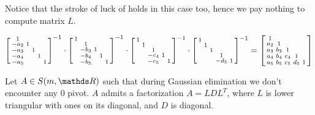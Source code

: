 \documentclass[computationalMathematics.tex]{subfiles}
\begin{document}
\begin{obs}
  Notice that the stroke of luck of  holds in this case too, hence we pay nothing to compute matrix $L$.
  
\begin{gather*}
\begin{bsmallmatrix}
    1 & \\
    -a_2 & 1 & \\
    -a_3 &  & 1  \\
    -a_4 &  & & 1  \\
    -a_5 &  &  & & 1 
\end{bsmallmatrix}^{-1} \cdot
\begin{bsmallmatrix}
    1 & \\
     & 1 & \\
     & -b_3 & 1  \\
     & -b_4 & & 1  \\
     & -b_5 &  & & 1 
\end{bsmallmatrix}^{-1} \cdot
\begin{bsmallmatrix}
    1 & \\
     & 1 & \\
     &  & 1  \\
     &  & -c_4& 1  \\
     &  & -c_5 & & 1 
\end{bsmallmatrix}^{-1} \cdot 
\begin{bsmallmatrix}
    1 & \\
     & 1 & \\
     &  & 1  \\
     &  & & 1  \\
     &  &  & -d_5& 1 
\end{bsmallmatrix}^{-1}
= \begin{bsmallmatrix}
    1 & \\
    a_2 & 1 & \\
    a_3 & b_3 & 1  \\
    a_4 & b_4 & c_4& 1  \\
    a_5 & b_5 & c_5 &d_5 & 1     
\end{bsmallmatrix}
\end{gather*}
\end{obs}

\begin{theorem}
Let $A \in S(m, \R)$ such that during Gaussian elimination we don't encounter any $0$ pivot. $A$ admits a factorization $A=LDL^T$, where $L$ is lower triangular with ones on its diagonal, and $D$ is diagonal.
\end{theorem}
\end{document}
